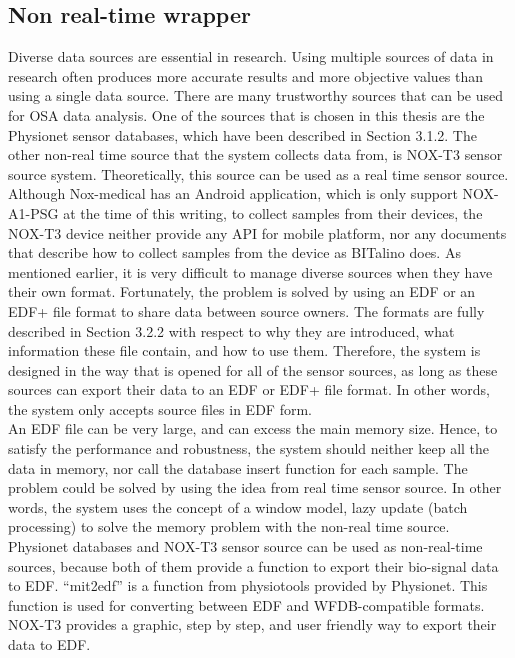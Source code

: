 \subsection{Non real-time wrapper}
Diverse data sources are essential in research. Using multiple sources of data in research often produces more accurate results and more objective values than using a single data source. There are many trustworthy sources that can be used for OSA data analysis. One of the sources that is chosen in this thesis are the Physionet sensor databases, which have been described in Section 3.1.2. The other non-real time source that the system collects data from, is NOX-T3 sensor source system. Theoretically, this source can be used as a real time sensor source. Although Nox-medical has an Android application, which is only support NOX-A1-PSG at the time of this writing, to collect samples from their devices, the NOX-T3 device neither provide any API for mobile platform, nor any documents that describe how to collect samples from the device as BITalino does. As mentioned earlier, it is very difficult to manage diverse sources when they have their own format. Fortunately, the problem is solved by using an EDF or an EDF+ file format to share data between source owners. The formats are fully described in Section 3.2.2 with respect to why they are introduced, what information these file contain, and how to use them. Therefore, the system is designed in the way that is opened for all of the sensor sources, as long as these sources can export their data to an EDF or EDF+ file format. In other words, the system only accepts source files in EDF form.\\
An EDF file can be very large, and can excess the main memory size. Hence, to satisfy the performance and robustness, the system should neither keep all the data in memory, nor call the database insert function for each sample. The problem could be solved by using the idea from real time sensor source. In other words, the system uses the concept of a window model, lazy update (batch processing) to solve the memory problem with the non-real time source.\\
Physionet databases and NOX-T3 sensor source can be used as non-real-time sources, because both of them provide a function to export their bio-signal data to EDF. “mit2edf” is a function from physiotools provided by Physionet. This function is used for converting between EDF and WFDB-compatible formats. NOX-T3 provides a graphic, step by step, and user friendly way to export their data to EDF.
